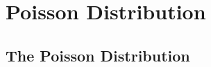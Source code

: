 \documentclass[../maths.tex]{subfiles}
\begin{document}
\chapter{Poisson Distribution}
\section{The Poisson Distribution}
\end{document}
